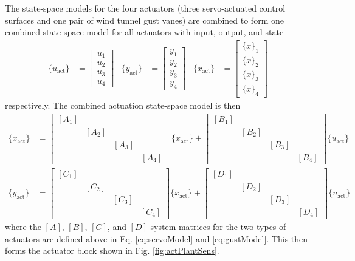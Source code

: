 The state-space models for the four actuators (three servo-actuated control surfaces and one pair of wind tunnel gust vanes) are combined to form one combined state-space model for all actuators with input, output, and state
\begin{align}
    \{u_\text{act}\} &= \begin{bmatrix} u_1 \\ u_2 \\ u_3 \\ u_4 \end{bmatrix} &
    \{y_\text{act}\} &= \begin{bmatrix} y_1 \\ y_2 \\ y_3 \\ y_4 \end{bmatrix} &
    \{x_\text{act}\} &= \begin{bmatrix} \{x\}_1 \\ \{x\}_2 \\ \{x\}_3 \\ \{x\}_4 \end{bmatrix}
\end{align}
respectively. The combined actuation state-space model is then
\begin{equation}
\begin{aligned}
    \{x_\text{act}\} &= \begin{bmatrix}
        [A_1] & & & \\ & [A_2] & & \\ & & [A_3] & \\ & & & [A_4]
        \end{bmatrix} \{x_\text{act}\}
        + \begin{bmatrix}
        [B_1] & & & \\ & [B_2] & & \\ & & [B_3] & \\ & & & [B_4]
        \end{bmatrix} \{u_\text{act}\} \\
    \{y_\text{act}\} &= \begin{bmatrix}
        [C_1] & & & \\ & [C_2] & & \\ & & [C_3] & \\ & & & [C_4]
        \end{bmatrix} \{x_\text{act}\}
        + \begin{bmatrix}
        [D_1] & & & \\ & [D_2] & & \\ & & [D_3] & \\ & & & [D_4]
        \end{bmatrix} \{u_\text{act}\}
\end{aligned}
\end{equation}
where the $[A]$, $[B]$, $[C]$, and $[D]$ system matrices for the two types of actuators are defined above in Eq. \ref{eq:servoModel} and \ref{eq:gustModel}. This then forms the actuator block shown in Fig. \ref{fig:actPlantSens}.

